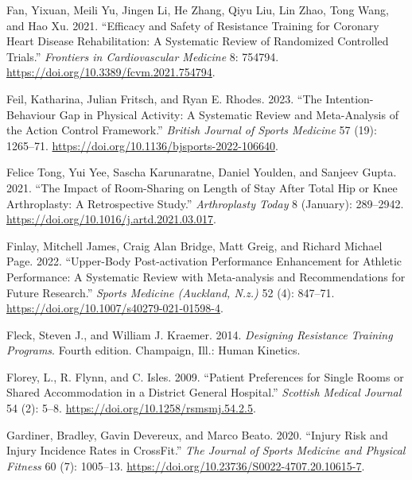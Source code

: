 \documentclass[
  letterpaper,
  DIV=11,
  numbers=noendperiod]{scrreprt}
\newlength{\cslhangindent}
\newenvironment{CSLReferences}[2] %
 {\begin{list}{}{%
  \setlength{\itemindent}{0pt}
  \setlength{\leftmargin}{0pt}
  \setlength{\parsep}{0pt}
  \ifodd #1
   \setlength{\leftmargin}{\cslhangindent}
   \setlength{\itemindent}{-1\cslhangindent}
  \fi
  \setlength{\itemsep}{#2\baselineskip}}}
 {\end{list}}
\begin{document}
\begin{CSLReferences}{1}{0}
Fan, Yixuan, Meili Yu, Jingen Li, He Zhang, Qiyu Liu, Lin Zhao, Tong
Wang, and Hao Xu. 2021. {``Efficacy and {Safety} of {Resistance
Training} for {Coronary Heart Disease Rehabilitation}: {A Systematic
Review} of {Randomized Controlled Trials}.''} \emph{Frontiers in
Cardiovascular Medicine} 8: 754794.
\url{https://doi.org/10.3389/fcvm.2021.754794}.

Feil, Katharina, Julian Fritsch, and Ryan E. Rhodes. 2023. {``The
Intention-Behaviour Gap in Physical Activity: A Systematic Review and
Meta-Analysis of the Action Control Framework.''} \emph{British Journal
of Sports Medicine} 57 (19): 1265--71.
\url{https://doi.org/10.1136/bjsports-2022-106640}.

Felice Tong, Yui Yee, Sascha Karunaratne, Daniel Youlden, and Sanjeev
Gupta. 2021. {``The {Impact} of {Room-Sharing} on {Length} of {Stay
After Total Hip} or {Knee Arthroplasty}: {A Retrospective Study}.''}
\emph{Arthroplasty Today} 8 (January): 289--2942.
\url{https://doi.org/10.1016/j.artd.2021.03.017}.

Finlay, Mitchell James, Craig Alan Bridge, Matt Greig, and Richard
Michael Page. 2022. {``Upper-{Body Post-activation Performance
Enhancement} for {Athletic Performance}: {A Systematic Review} with
{Meta-analysis} and {Recommendations} for {Future Research}.''}
\emph{Sports Medicine (Auckland, N.z.)} 52 (4): 847--71.
\url{https://doi.org/10.1007/s40279-021-01598-4}.

Fleck, Steven J., and William J. Kraemer. 2014. \emph{Designing
Resistance Training Programs}. Fourth edition. Champaign, Ill.: Human
Kinetics.

Florey, L., R. Flynn, and C. Isles. 2009. {``Patient Preferences for
Single Rooms or Shared Accommodation in a District General Hospital.''}
\emph{Scottish Medical Journal} 54 (2): 5--8.
\url{https://doi.org/10.1258/rsmsmj.54.2.5}.

Gardiner, Bradley, Gavin Devereux, and Marco Beato. 2020. {``Injury Risk
and Injury Incidence Rates in {CrossFit}.''} \emph{The Journal of Sports
Medicine and Physical Fitness} 60 (7): 1005--13.
\url{https://doi.org/10.23736/S0022-4707.20.10615-7}.


\end{CSLReferences}
\end{document}
